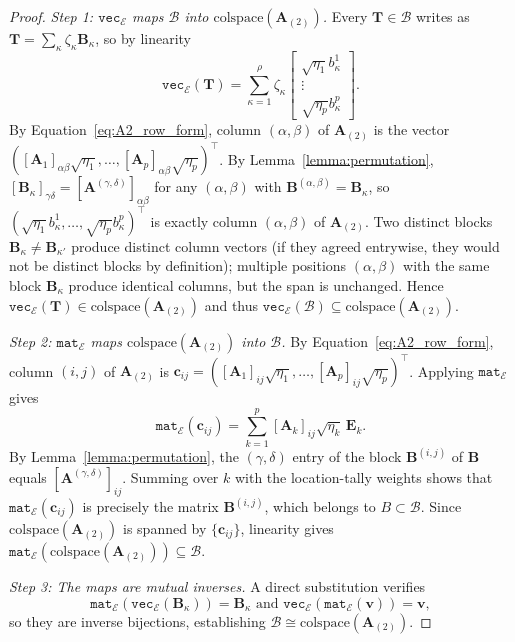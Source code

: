 \documentclass{siamart251216}
\newcommand{\munfold}[2]{\mathbf{#1}_{(#2)}}
\def\bA{\mathbf{A}}
\def\bB{\mathbf{B}}
\def\bE{\mathbf{E}}
\def\bT{\mathbf{T}}
\def\bc{\mathbf{c}}
\def\bv{\mathbf{v}}
\begin{document}
\begin{proof}
\textit{Step 1: $\mathtt{vec}_{\mathscr{E}}$ maps $\mathscr{B}$ into $\mathrm{colspace}(\munfold{A}{2})$.}
Every $\bT\in\mathscr{B}$ writes as $\bT = \sum_\kappa \zeta_\kappa\bB_\kappa$, so by linearity
\[ \mathtt{vec}_{\mathscr{E}}(\bT)
= \sum_{\kappa=1}^{\rho}\zeta_\kappa
\begin{bmatrix}\sqrt{\eta_1}b_\kappa^1 \\ \vdots\\ \sqrt{\eta_p}b_\kappa^p\end{bmatrix}.
\]
By Equation~\eqref{eq:A2_row_form}, column $(\alpha,\beta)$ of $\munfold{A}{2}$ is the vector
$([\bA_1]_{\alpha\beta}\sqrt{\eta_1},\dots,[\bA_p]_{\alpha\beta}\sqrt{\eta_p})^\top$.
By Lemma~\ref{lemma:permutation}, $[\bB_\kappa]_{\gamma\delta} = [\bA^{(\gamma,\delta)}]_{\alpha\beta}$
for any $(\alpha,\beta)$ with $\bB^{(\alpha,\beta)}=\bB_\kappa$, so \linebreak
$(\sqrt{\eta_1}b_\kappa^1,\dots,\sqrt{\eta_p}b_\kappa^p)^\top$ is exactly column $(\alpha,\beta)$
of $\munfold{A}{2}$.  Two distinct blocks $\bB_\kappa\ne\bB_{\kappa'}$ produce distinct column vectors (if they agreed entrywise, they would not be distinct blocks by definition); multiple positions $(\alpha,\beta)$ with the same block $\bB_\kappa$ produce identical columns, but the span is unchanged.  Hence
$\mathtt{vec}_{\mathscr{E}}(\bT)\in\mathrm{colspace}(\munfold{A}{2})$ and thus $\mathtt{vec}_{\mathscr{E}}(\mathscr{B})\subseteq\mathrm{colspace}(\munfold{A}{2})$.

\textit{Step 2: $\mathtt{mat}_{\mathscr{E}}$ maps $\mathrm{colspace}(\munfold{A}{2})$ into $\mathscr{B}$.}
By Equation~\eqref{eq:A2_row_form}, column $(i,j)$ of $\munfold{A}{2}$ is
$\bc_{ij} = ([\bA_1]_{ij}\sqrt{\eta_1},\dots,[\bA_p]_{ij}\sqrt{\eta_p})^\top$.
Applying $\mathtt{mat}_{\mathscr{E}}$ gives
\[
\mathtt{mat}_{\mathscr{E}}(\bc_{ij}) = \sum_{k=1}^p [\bA_k]_{ij}\sqrt{\eta_k}\,\bE_k.
\]
By Lemma~\ref{lemma:permutation}, the $(\gamma,\delta)$ entry of the block $\bB^{(i,j)}$ of $\bB$
equals $[\bA^{(\gamma,\delta)}]_{ij}$.  Summing over $k$ with the location-tally weights shows
that $\mathtt{mat}_{\mathscr{E}}(\bc_{ij})$ is precisely the matrix $\bB^{(i,j)}$,
which belongs to $B\subset\mathscr{B}$.  Since $\mathrm{colspace}(\munfold{A}{2})$ is spanned by
$\{\bc_{ij}\}$, linearity gives $\mathtt{mat}_{\mathscr{E}}(\mathrm{colspace}(\munfold{A}{2}))\subseteq\mathscr{B}$. 

\textit{Step 3: The maps are mutual inverses.}
A direct substitution verifies
$$\mathtt{mat}_{\mathscr{E}}(\mathtt{vec}_{\mathscr{E}}(\bB_\kappa))=\bB_\kappa \mbox{ and } 
\mathtt{vec}_{\mathscr{E}}(\mathtt{mat}_{\mathscr{E}}(\bv))=\bv,$$
so they are inverse bijections, establishing $\mathscr{B}\cong\mathrm{colspace}(\munfold{A}{2})$.
\end{proof}
\end{document}
